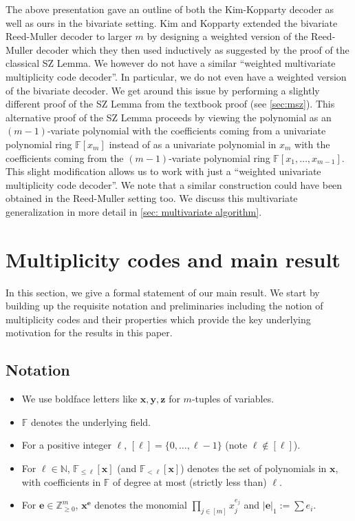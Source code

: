 \documentclass{theoretics}
\def\Integer{\mathbb{Z}}
\def\Natural{\mathbb{N}}
\def\Field{\mathbb{F}}
\let\N\Natural
\let\Z\Integer
\let\F\Field
\def\vece{\mathbf{e}}
\def\vecx{\mathbf{x}}
\def\vecy{\mathbf{y}}
\def\vecz{\mathbf{z}}
\newcommand{\vy}{\vecy}
\newcommand{\vz}{\vecz}
\newcommand{\vx}{\vecx}
\newcommand{\ve}{\vece}
\begin{document}
	The above presentation gave an outline of both the Kim-Kopparty
	decoder as well as ours in the bivariate setting. Kim and Kopparty
	extended the bivariate Reed-Muller decoder to larger $m$ by designing
	a weighted version of the Reed-Muller decoder which they then used
	inductively as suggested by the proof of the classical SZ Lemma. We
	however do not have a similar ``weighted multivariate multiplicity
	code decoder''. In particular, we do not even have a weighted version of
	the bivariate decoder. We get around this issue by performing a
	slightly different proof of the SZ Lemma from the textbook proof (see \cref{sec:msz}). This
	alternative proof of the SZ Lemma proceeds by viewing the
	polynomial as an $(m-1)$-variate polynomial with the coefficients
	coming from a univariate polynomial ring $\F[x_m]$ instead of as a
	univariate polynomial in $x_m$ with the coefficients coming from the
	$(m-1)$-variate polynomial ring $\F[x_1, \ldots, x_{m-1}]$. This
	slight modification allows us to work with just a ``weighted
	univariate multiplicity code decoder''. We note that a similar
	construction could have been obtained in the Reed-Muller setting too. We discuss this multivariate generalization in more detail in \cref{sec: multivariate algorithm}. 
	
	
	\section{Multiplicity codes and main result} \label{sec: mult prelims}
	In this section, we give a formal statement of our main result. We start by building up the requisite notation and preliminaries including the notion of multiplicity codes and their properties which provide the key underlying motivation for the results in this paper.  
	
	\subsection{Notation}
	
	\begin{itemize}
		\item We use boldface letters like $\vx, \vy, \vz$ for $m$-tuples of
		variables. 
		\item $\F$ denotes the underlying field. 
		\item For a positive integer $\ell$, $[\ell] = \{0, \ldots, \ell -
		1\}$ (note $\ell \notin [\ell]$). 
		\item For $\ell \in \N$, $\F_{\leq \ell}[\vx]$ (and $\F_{<\ell}[\vx]$)
		denotes the set of
		polynomials in $\vx$, with coefficients in $\F$ of degree at most
		(strictly less than)
		$\ell$. 
		\item For $\ve \in \Z_{\geq 0}^m$, $\vx^{\ve}$ denotes the monomial
		$\prod_{j\in [m]} x_j^{e_j}$ and $|\ve|_1 := \sum e_i$.
	\end{itemize}
	
\end{document}
